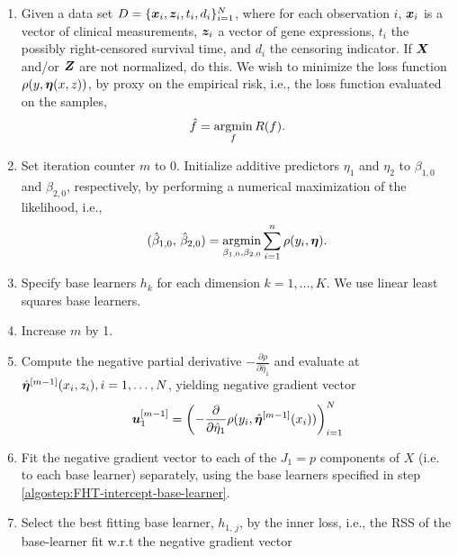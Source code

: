 \begin{enumerate}
    \item
        Given a data set $D=\{\bm{x}_i, \bm{z}_i, t_i,d_i\}_{i=1}^N$, where for each observation $i$, $\bm{x}_i$ is a vector of clinical measurements,
        $\bm{z}_i$ a vector of gene expressions, $t_i$ the possibly right-censored survival time, and $d_i$ the censoring indicator. 
        If $\bm{X}$ and/or $\bm{Z}$ are not normalized, do this.
        We wish to minimize the loss function $\rho(y,\boldsymbol{\eta}(x,z))$, by proxy on the empirical risk, i.e., the loss function evaluated on the samples,
        \begin{equation}
            \hat{f}=\operatorname*{argmin}_{f}R(f).
        \end{equation}
    \item
        Set iteration counter $m$ to $0$.
        Initialize additive predictors $\eta_1$ and $\eta_2$ to $\beta_{1,0}$ and $\beta_{2,0}$, respectively, by performing a numerical maximization of the likelihood, i.e.,
        \begin{equation}
            (\hat{\beta}_{1,0},\,\hat{\beta}_{2,0})=\operatorname*{argmin}_{\beta_{1,0},\beta_{2,0}}\sum_{i=1}^n\rho(y_i,\boldsymbol{\eta}).
        \end{equation}
    \item\label{algostep:FHT-intercept-base-learner}
        Specify base learners $h_k$ for each dimension $k=1,\ldots,K$.
        We use linear least squares base learners.
    \item\label{algostep:FHT-intercept-init}
        Increase $m$ by 1.
    \item
        Compute the negative partial derivative $-\frac{\partial\rho}{\partial \hat{\eta}_1}$
        and evaluate at $\hat{\boldsymbol{\eta}}^{[m-1]}(x_i,z_i),i=1,\ldots,N$, yielding negative gradient vector
        \begin{equation}
            \bm{u}^{[m-1]}_1=\left(-\frac{\partial}{\partial \hat{\eta}_1}\rho(y_i, \hat{\boldsymbol{\eta}}^{[m-1]}(x_i))\right)_{i=1}^N
        \end{equation}
    \item
        Fit the negative gradient vector to each of the $J_1=p$ components of $X$ (i.e. to each base learner) separately, using the base learners specified in step \ref{algostep:FHT-intercept-base-learner}.
    \item
        Select the best fitting base learner, $h_{1,\,j}$, by the inner loss,
        i.e., the RSS of the base-learner fit w.r.t the negative gradient vector
        \begin{equation}

\end{equation}
\end{enumerate}
